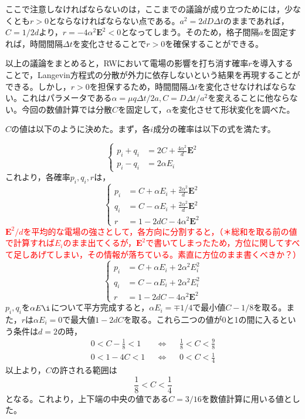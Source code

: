 \documentclass[autodetect-engine,dvi=dvipdfmx,a4paper,ja=standard,oneside,openany,11pt,draft]{bxjsbook}
\begin{document}
ここで注意しなければならないのは，ここまでの議論が成り立つためには，少なくとも$r>0$とならなければならない点である。$a^2=2dD\Delta t$のままであれば，$C=1/2d$より，$r=-4\alpha^2\bm{E}^2<0$となってしまう。そのため，格子間隔$a$を固定すれば，時間間隔$\Delta t$を変化させることで$r>0$を確保することができる。

以上の議論をまとめると，RWにおいて電場の影響を打ち消す確率$r$を導入することで，Langevin方程式の分散が外力に依存しないという結果を再現することができる。しかし，$r>0$を担保するため，時間間隔$\Delta t$を変化させなければならない。これはパラメータである$\alpha=\mu q\Delta t/2a,C=D\Delta t/a^2$を変えることに他ならない。今回の数値計算では分散$C$を固定して，$\alpha$を変化させて形状変化を調べた。

$C$の値は以下のように決めた。まず，各$i$成分の確率は以下の式を満たす。

\begin{equation}
  \left\{
  \begin{aligned}
    p_i+q_i & =2C+\frac{4\alpha^2}{d}\bm{E}^2 \\
    p_i-q_i & =2\alpha E_i
  \end{aligned}
  \right.
  \label{eq:prob}
\end{equation}
これより，各確率$p_i,q_i,r$は，
\begin{equation}
  \left\{
  \begin{aligned}
    p_i & =C+\alpha E_i+\frac{2\alpha^2}{d}\bm{E}^2 \\
    q_i & =C-\alpha E_i+\frac{2\alpha^2}{d}\bm{E}^2 \\
    r   & =1-2dC-4\alpha^2\bm{E}^2
  \end{aligned}
  \right.
  \label{eq:prob2}
\end{equation}
\textcolor{red}{$\bm{E}^2/d$を平均的な電場の強さとして，各方向に分割すると，（＊総和を取る前の値で計算すれば$E_i$のまま出てくるが，$\bm{E}^2$で書いてしまったため，方位に関してすべて足しあげてしまい，その情報が落ちている。素直に方位のまま書くべきか？）}
\begin{equation}
  \left\{
  \begin{aligned}
    p_i & =C+\alpha E_i+2\alpha^2 E_i^2 \\
    q_i & =C-\alpha E_i+2\alpha^2 E_i^2 \\
    r   & =1-2dC-4\alpha^2\bm{E}^2
  \end{aligned}
  \right.
  \label{eq:prob3}
\end{equation}
$p_i,q_i$を$\alpha E\i$について平方完成すると，$\alpha E_i=\mp1/4$で最小値$C-1/8$を取る。また，$r$は$\alpha E_i=0$で最大値$1-2dC$を取る。これら二つの値が0と1の間に入るという条件は$d=2$の時，
\begin{align}
  0<C-\frac{1}{8}<1 &  & \Leftrightarrow &  & \frac{1}{8}<C<\frac{9}{8} \\
  0<1-4C<1          &  & \Leftrightarrow &  & 0<C<\frac{1}{4}
  \label{eq:condition}
\end{align}
以上より，$C$の許される範囲は
\begin{equation}
  \frac{1}{8}<C<\frac{1}{4}
  \label{eq:condition2}
\end{equation}
となる。これより，上下端の中央の値である$C=3/16$を数値計算に用いる値とした。
\end{document}
